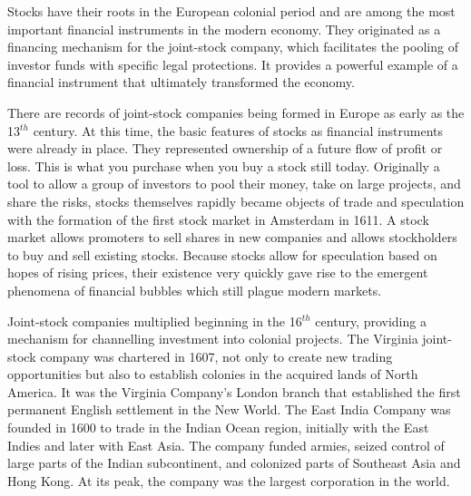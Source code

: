 Stocks have their roots in the European colonial period and are among the most important financial instruments in the modern economy. %
They originated as a financing mechanism for the \gls{joint-stock company},  
which facilitates the pooling of investor funds with specific legal protections. It provides a powerful example of a financial instrument that ultimately transformed the economy. 

There are records of joint-stock companies being formed in Europe as early as the 13$^{th}$ century. At this time, the basic features of stocks as financial instruments were already in place. They represented ownership of a future flow of profit or loss. This is what you purchase when you buy a stock still today. Originally a tool to allow a group of investors to pool their money, take on large projects, and share the risks, stocks themselves rapidly became objects of trade and speculation with the formation of the first stock market in Amsterdam in 1611. 
A stock market allows promoters to sell shares in new companies and allows stockholders to buy and sell existing stocks. 
Because stocks allow for speculation based on hopes of rising prices, their existence very quickly gave rise to the emergent phenomena of financial bubbles which still plague modern markets. 




Joint-stock companies multiplied beginning in the 16$^{th}$ century, providing a mechanism for channelling investment into colonial projects. The Virginia joint-stock company was chartered in 1607, not only to create new trading opportunities but also to establish colonies in the acquired lands of North America.  It was the Virginia Company's London branch that established the first permanent English settlement in the New World. The East India Company was founded in 1600 to trade in the Indian Ocean region, initially with the East Indies and later with East Asia. The company funded armies, seized control of large parts of the Indian subcontinent, and colonized parts of Southeast Asia and Hong Kong. At its peak, the company was the largest corporation in the world. 

